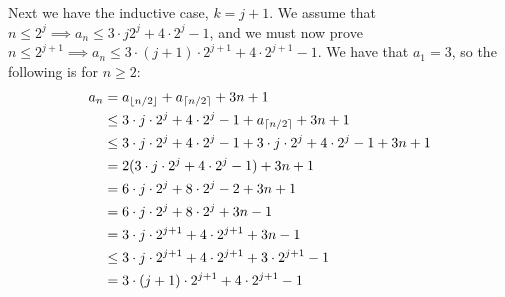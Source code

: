 \documentclass[a4paper]{article}
\begin{document}
Next we have the inductive case, $k=j+1$.
We assume that $n \leq 2^j \implies a_n \leq 3 \cdot j2^j + 4 \cdot 2^j - 1$, and we must now prove $n \leq 2^{j+1} \implies a_n \leq 3 \cdot (j+1) \cdot 2^{j+1} + 4 \cdot 2^{j+1} - 1$. We have that $a_1 = 3$, so the following is for $n \geq 2$:
\[
\begin{aligned}
  a_n & = a_{\floor*{n/2}} + a_{\ceil*{n/2}} + 3n + 1 \\
  & \leq 3 \cdot j \cdot 2^j + 4 \cdot 2^j - 1 + a_{\ceil*{n/2}} + 3n + 1 \\
  & \leq 3 \cdot j \cdot 2^j + 4 \cdot 2^j - 1 + 3 \cdot j \cdot 2^j + 4 \cdot 2^j - 1 + 3n + 1 \\
  & = 2(3 \cdot j \cdot 2^j + 4 \cdot 2^j - 1) + 3n + 1 \\
  & = 6 \cdot j \cdot 2^j + 8 \cdot 2^j - 2 + 3n + 1 \\
  & = 6 \cdot j \cdot 2^j + 8 \cdot 2^j + 3n - 1 \\
  & = 3 \cdot j \cdot 2^{j+1} + 4 \cdot 2^{j+1} + 3n - 1 \\
  & \leq 3 \cdot j \cdot 2^{j+1} + 4 \cdot 2^{j+1} + 3 \cdot 2^{j+1} - 1 \\
  & = 3 \cdot (j+1) \cdot 2^{j+1} + 4 \cdot 2^{j+1} - 1
\end{aligned}
\]
\end{document}
